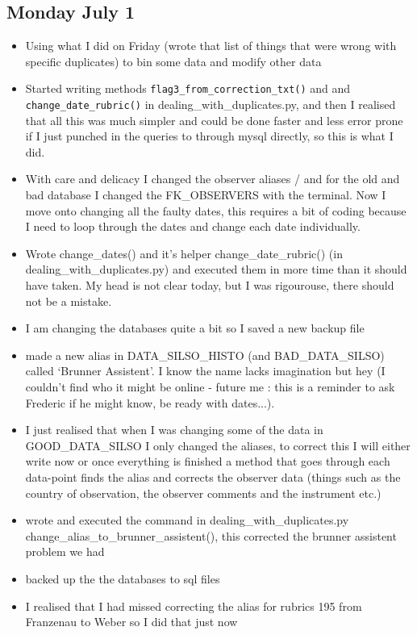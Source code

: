 \documentclass[12pt]{article}
\begin{document}
\subsection{Monday July 1}
\begin{itemize}
    \item Using what I did on Friday (wrote that list of things that were wrong with specific duplicates) to bin some data and modify other data
    \item Started writing methods \texttt{flag3\_from\_correction\_txt()} and  and \texttt{change\_date\_rubric()} in dealing\_with\_duplicates.py, and then I realised that all this was much simpler and could be done faster and less error prone if I just punched in the queries to through mysql directly, so this is what I did.
    \item With care and delicacy I changed the observer aliases / and for the old and bad database I changed the FK\_OBSERVERS with the terminal. Now I move onto changing all the faulty dates, this requires a bit of coding because I need to loop through the dates and change each date individually.
    \item Wrote change\_dates() and it's helper change\_date\_rubric() (in dealing\_with\_duplicates.py) and executed them in more time than it should have taken. My head is not clear today, but I was rigourouse, there should not be a mistake.
    \item I am changing the databases quite a bit so I saved a new backup file
    \item made a new alias in DATA\_SILSO\_HISTO (and BAD\_DATA\_SILSO) called `Brunner Assistent'. I know the name lacks imagination but hey (I couldn't find who it might be online - future me : this is a reminder to ask Frederic if he might know, be ready with dates...).
    \item I just realised that when I was changing some of the data in GOOD\_DATA\_SILSO I only changed the aliases, to correct this I will either write now or once everything is finished a method that goes through each data-point finds the alias and corrects the observer data (things such as the country of observation, the observer comments and the instrument etc.)
    \item wrote and executed the command in dealing\_with\_duplicates.py change\_alias\_to\_brunner\_assistent(), this corrected the brunner assistent problem we had
    \item backed up the the databases to sql files
    \item I realised that I had missed correcting the alias for rubrics 195 from Franzenau to Weber so I did that just now

\end{itemize}
\end{document}
